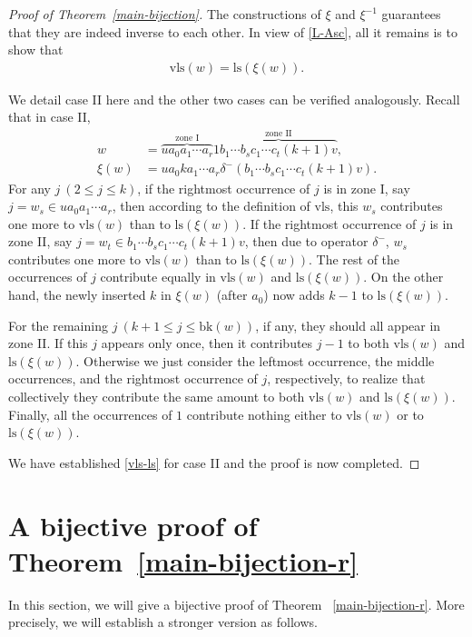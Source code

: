 \documentclass[12pt]{amsart}
\numberwithin{equation}{section}
\theoremstyle{plain}
\theoremstyle{definition}
\def\bk{\mathrm{bk}}
\def\ls{\mathrm{ls}}
\def\wls{\mathrm{vls}}
\begin{document}
\begin{proof}[Proof of Theorem~\ref{main-bijection}]
The constructions of $\xi$ and $\xi^{-1}$ guarantees that they are indeed inverse to each other. In view of \eqref{L-Asc}, all it remains is to show that
\begin{align}\label{vls-ls}
\wls(w)=\ls(\xi(w)).
\end{align}

We detail case II here and the other two cases can be verified analogously. Recall that in case II,
\begin{align*}
w &=\overbrace{u a_0a_1\cdots a_r}^{\text{zone I}} 1 \overbrace{b_1\cdots b_s c_1\cdots c_t (k+1)v}^{\text{zone II}},\\
\xi(w) &=ua_0ka_1\cdots a_r\delta^-(b_1\cdots b_s c_1\cdots c_t(k+1)v).
\end{align*}
For any $j~(2\le j \le k)$, if the rightmost occurrence of $j$ is in zone I, say $j=w_s\in u a_0a_1\cdots a_r$, then according to the definition of $\wls$, this $w_s$ contributes one more to $\wls(w)$ than to $\ls(\xi(w))$. If the rightmost occurrence of $j$ is in zone II, say $j=w_t\in b_1\cdots b_s c_1\cdots c_t (k+1)v$, then due to operator $\delta^-$, $w_s$ contributes one more to $\wls(w)$ than to $\ls(\xi(w))$. The rest of the occurrences of $j$ contribute equally in $\wls(w)$ and $\ls(\xi(w))$. On the other hand, the newly inserted $k$ in $\xi(w)$ (after $a_0$) now adds $k-1$ to $\ls(\xi(w))$.

For the remaining $j~(k+1\le j\le\bk(w))$, if any, they should all appear in zone II. If this $j$ appears only once, then it contributes $j-1$ to both $\wls(w)$ and $\ls(\xi(w))$. Otherwise we just consider the leftmost occurrence, the middle occurrences, and the rightmost occurrence of $j$, respectively, to realize that collectively they contribute the same amount to both $\wls(w)$ and $\ls(\xi(w))$. Finally, all the occurrences of $1$ contribute nothing either to $\wls(w)$ or to $\ls(\xi(w))$.

We have established \eqref{vls-ls} for case II and the proof is now completed.
\end{proof}


\section{A bijective proof of Theorem~\ref{main-bijection-r}}\label{sec:bijection}

In this section, we will give a bijective proof of Theorem
~\ref{main-bijection-r}. More precisely, we will establish a stronger version as follows.
\end{document}
